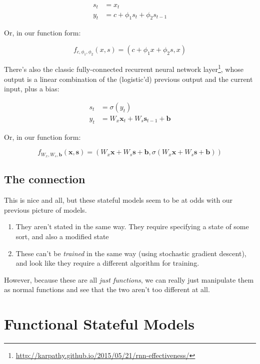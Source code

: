 \documentclass[]{article}
\renewcommand{\href}[2]{#2\footnote{\url{#1}}}
\begin{document}
\[
\begin{aligned}
s_t & = x_t \\
y_t & = c + \phi_1 s_t + \phi_2 s_{t - 1}
\end{aligned}
\]

Or, in our function form:

\[
f_{c, \phi_1, \phi_2}(x, s) = (c + \phi_1 x + \phi_2 s, x)
\]

There's also the classic
\href{http://karpathy.github.io/2015/05/21/rnn-effectiveness/}{fully-connected
recurrent neural network layer}, whose output is a linear combination of the
(logistic'd) previous output and the current input, plus a bias:

\[
\begin{aligned}
s_t & = \sigma(y_t) \\
y_t & = W_x \mathbf{x}_t + W_s \mathbf{s}_{t-1} + \mathbf{b}
\end{aligned}
\]

Or, in our function form:

\[
f_{W_x, W_s, \mathbf{b}}(\mathbf{x}, \mathbf{s}) =
  ( W_x \mathbf{x} + W_s \mathbf{s} + \mathbf{b}
  , \sigma(W_x \mathbf{x} + W_s \mathbf{s} + \mathbf{b})
  )
\]

\subsection{The connection}\label{the-connection}

This is nice and all, but these stateful models seem to be at odds with our
previous picture of models.

\begin{enumerate}
\def\labelenumi{\arabic{enumi}.}
\tightlist
\item
  They aren't stated in the same way. They require specifying a state of some
  sort, and also a modified state
\item
  These can't be \emph{trained} in the same way (using stochastic gradient
  descent), and look like they require a different algorithm for training.
\end{enumerate}

However, because these are all \emph{just functions}, we can really just
manipulate them as normal functions and see that the two aren't too different at
all.

\section{Functional Stateful Models}\label{functional-stateful-models}
\end{document}
